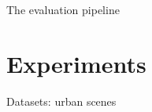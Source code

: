 \documentclass[10pt, export]{beamer}
\begin{document}
        \begin{frame}{The evaluation pipeline}
            \begin{figure}
                
            \end{figure}
        \end{frame}
    \section{Experiments}
        \begin{frame}{Datasets: urban scenes}
            \begin{figure}
                \begin{center}
                    
                \end{center}
            \end{figure}
        \end{frame}
\end{document}
